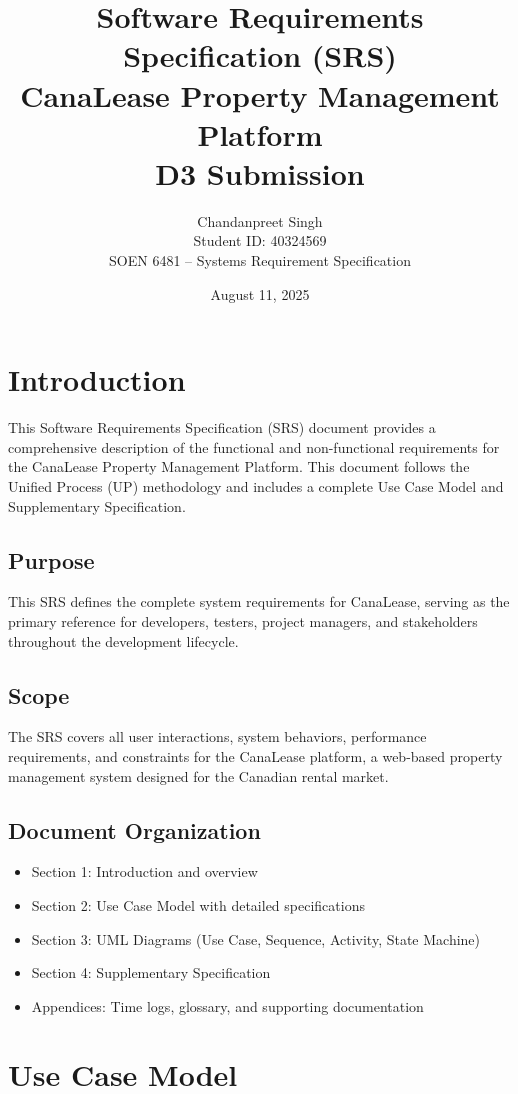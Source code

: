 \documentclass[12pt]{article}
\title{Software Requirements Specification (SRS)\\
\large CanaLease Property Management Platform\\
\small D3 Submission}
\author{Chandanpreet Singh \\ Student ID: 40324569 \\ SOEN 6481 -- Systems Requirement Specification}
\date{August 11, 2025}
\begin{document}
\maketitle
\tableofcontents
\newpage

\section{Introduction}

This Software Requirements Specification (SRS) document provides a comprehensive description of the functional and non-functional requirements for the CanaLease Property Management Platform. This document follows the Unified Process (UP) methodology and includes a complete Use Case Model and Supplementary Specification.

\subsection{Purpose}
This SRS defines the complete system requirements for CanaLease, serving as the primary reference for developers, testers, project managers, and stakeholders throughout the development lifecycle.

\subsection{Scope}
The SRS covers all user interactions, system behaviors, performance requirements, and constraints for the CanaLease platform, a web-based property management system designed for the Canadian rental market.

\subsection{Document Organization}
\begin{itemize}
    \item Section 1: Introduction and overview
    \item Section 2: Use Case Model with detailed specifications
    \item Section 3: UML Diagrams (Use Case, Sequence, Activity, State Machine)
    \item Section 4: Supplementary Specification
    \item Appendices: Time logs, glossary, and supporting documentation
\end{itemize}

\section{Use Case Model}
\end{document}
